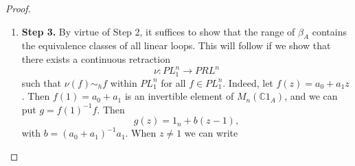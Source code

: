 \documentclass{book}
\def\diag{\textnormal{diag}}
\begin{document}
\begin{proof}
\begin{enumerate}[label={}]
\begin{enumerate}[label={}]
\[        A_{m-1}= 
        \begin{pmatrix} 1&0&\cdots&-(a_{m-1}+a_m z)&0\\ 0&1&\cdots&0&0\\ \vdots&\vdots&&\vdots&\vdots\\ 0&0&\cdots&0&1 \end{pmatrix}, 
        \ldots, 
      \] 
      \[ 
        A_1= 
        \begin{pmatrix} 1&-\bigl(a_1+a_2z+\cdots+a_m z^{m-1}\bigr)&0&\cdots&0\\ 0&1&0&\cdots&0\\ \vdots&\vdots&\vdots&&\vdots\\ 0&0&0&\cdots&1 \end{pmatrix}. 
      \] 
      and matrices \(B_k\) having \(1\)'s on the main diagonal, \(z\) in the entry in column \(k\) and row \(k+1\), and \(0\)'s elsewhere.
      Then we have
      \[
        A_1 A_2\cdots A_m \tilde{\mu}_m^n (f) (z)=
        \begin{pmatrix}
          f(z)&0&\cdots&0&0\\
          -z&1&\cdots&0&0\\
          \vdots&\vdots&&\vdots&\vdots\\
          0&0&\cdots&-z&1
        \end{pmatrix}
      \]
      and 
      \begin{equation}\label{eq:827}
        A_1 A_2\cdots A_m \tilde{\mu}_m^n (f)(z)B_m B_{m-1}\cdots B_1=\diag(f(z),1_{mn}).
      \end{equation}
      Since \(f(z)\) and all the matrices \(A_1,\ldots,A_m,B_1,\ldots,B_m\) are invertible for all \(z\), we obtain (i).
      Furthermore, each of the \(A_j\) and \(B_j\) matrices may be continuously deformed to the identity within the set of polynomial loops by multiplying
      the sole off-diagonal entry with a parameter \(t\in[0,1]\). Thus (\ref{eq:827}) implies (ii) and (iii).
      \item \textbf{Step 3.} By virtue of Step 2, it suffices to show that the range of \(\beta_A\) contains the equivalence 
      classes of all linear loops. This will follow if we show that there exists a continuous retraction
      \[
        \nu:PL_1^n\rightarrow PRL^n
      \]
      such that \(\nu(f)\sim_h f\) within \(PL_1^n\) for all \(f\in PL_1^n\). Indeed, let \(f(z)=a_0+a_1 z\). Then
      \(f(1)=a_0+a_1\) is an invertible element of \(M_n(\mathbb{C}1_A)\), and we can put \(g={f(1)}^{-1}f\). Then
      \[
        g(z)=1_n+b(z-1),
      \]
      with \(b={(a_0+a_1)}^{-1}a_1\). When \(z\neq 1\) we can write 

\end{enumerate}
\end{enumerate}
\end{proof}
\end{document}
